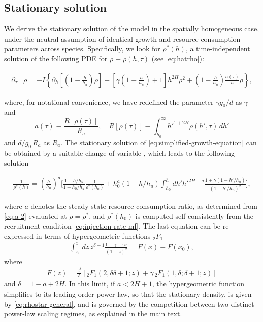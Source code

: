 \documentclass[aps,pre,twocolumn,superscriptaddress,10pt]{revtex4-2}
\begin{document}
\subsection*{Stationary solution}
We derive the stationary solution of the model in the spatially homogeneous case, under the neutral assumption of identical growth and resource-consumption parameters across species. Specifically, we look for $\rho^*(h)$, a time-independent solution of the following PDE for $\rho \equiv \rho(h,\tau)$ (see \cref{eq:hatrho}):
\begin{widetext}
\begin{align}
   \! \!\partial_\tau&\rho =-\!I\!\left\{\!\partial_h\! \left[\!\left(1\!-\!\frac{h}{h_u}\!\right)\rho\right] \!+\!\left[\!\gamma \left(\!1\!-\!\frac{h}{h_u}\!\right)\!+\!1\!\right]h^{2H}\!\rho^2 \!+\! \left(1\!-\!\frac{h}{h_u}\!\right)\!\frac{a(\tau)}{h}\rho\!\right\},
    \label{eq:simplified-growth-equation}
\end{align}
\end{widetext}
where, for notational convenience, we have redefined the parameter $\gamma g_0/d$ as $\gamma$ and 
\begin{equation}\label{eq:a-2}
    a(\tau)\equiv \frac{R[\rho(\tau)]}{R_a},\quad R[\rho(\tau)]\!\equiv\! \int_{h_0}^\infty \!\!\!\!h'^{1+2H}\rho(h',\tau)\,dh'
\end{equation} 
and $ d/g_0 \,R_a$ as $R_a$.
The stationary solution of \cref{eq:simplified-growth-equation} can be obtained by a suitable change of variable \SInoref, which leads to the following solution
\begin{widetext}
\begin{equation}\label{eq:statsol}
\begin{split}
    \! \frac{1}{ \rho^*(h)}\!  =\!  \left(\! \frac{h}{h_0} \right)^a\!  \Bigg[\frac{1\! -\! h/h_u}{1\! -\! h_0/h_u} \frac{1}{ \rho^*(h_0)} +\!h_0^a (1-h/h_u)\! \int_{h_0}^{h} dh' \! h'^{2H-a}\frac{1+\gamma(1-h'/h_u)}{\left(1-h'/h_u \right)^2}\! \Bigg],
    \end{split}
\end{equation}
\end{widetext}
where $a$ denotes the steady-state resource consumption ratio, as determined from \cref{eq:a-2} evaluated at $\rho=\rho^{*}$, and $\rho^*(h_0)$ is computed self-consistently from the recruitment condition \cref{eq:injection-rate-mf}. The last equation can be  re-expressed in terms of hypergeometric functions ${}_2F_1$
\begin{align}
\int_{x_0}^{x} dz\,
z^{\delta-1}\frac{1+\gamma-\gamma z}{(1-z)^2} = F(x)-F(x_0),
\end{align}
where 
\begin{align}
    F(z)= \frac{z^{\delta}}{\delta} \left[
{}_2F_1\!\left(2,\delta \delta+1;z\right) + \gamma\,{}_2F_1\!\left(1,\delta;\delta+1;z\right) \right]
\end{align}
and $\delta = 1-a+2H$.
In this limit,  if $a<2H+1$, the hypergeometric function simplifies to its leading-order power law,
so that the stationary density, is given by \cref{eq:rhostar-general}, and is governed by the competition between two distinct power-law scaling regimes, as explained in the main text.
\end{document}
